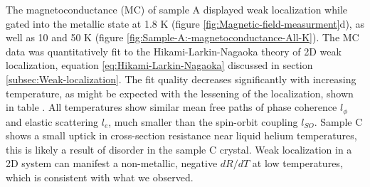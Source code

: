 The magnetoconductance (MC) of sample A displayed weak localization
while gated into the metallic state at 1.8 K (figure \ref{fig:Magnetic-field-measurment}d),
as well as 10 and 50 K (figure \ref{fig:Sample-A:-magnetoconductance-All-K}).
The MC data was quantitatively fit to the Hikami-Larkin-Nagaoka theory
of 2D weak localization, equation \ref{eq:Hikami-Larkin-Nagaoka}
discussed in section \ref{subsec:Weak-localization}. The fit quality
decreases significantly with increasing temperature, as might be expected
with the lessening of the localization, shown in table \pageref{tab:Sample-A:-magnetoconductance}.
All temperatures show similar mean free paths of phase coherence $l_{\phi}$
and elastic scattering $l_{e}$, much smaller than the spin-orbit
coupling $l_{SO}$. Sample C shows a small uptick in cross-section
resistance near liquid helium temperatures, this is likely a result
of disorder in the sample C crystal. Weak localization in a 2D system
can manifest a non-metallic, negative $dR/dT$ at low temperatures\citep{lee1985disordered},
which is consistent with what we observed.

